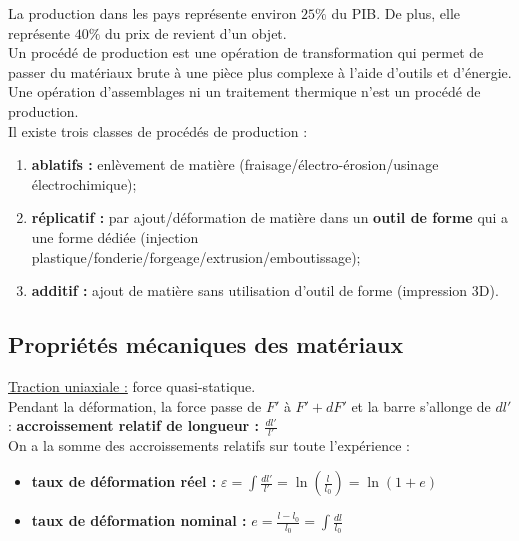 \documentclass[../main.tex]{subfiles}
\begin{document}
\localtableofcontents
La production dans les pays représente environ $25\%$ du PIB. De plus, elle représente $40\%$ du prix de revient d'un objet.\\

Un procédé de production est une opération de transformation qui permet de passer du matériaux brute à une pièce plus complexe à l'aide d'outils et d'énergie.\\
\warning Une opération d'assemblages ni un traitement thermique n'est un procédé de production.\\

Il existe trois classes de procédés de production :\\
\begin{enumerate}
    \item \textbf{ablatifs :} enlèvement de matière (fraisage/électro-érosion/usinage électrochimique);\\
    \item \textbf{réplicatif :} par ajout/déformation de matière dans un \textbf{outil de forme} qui a une forme dédiée (injection plastique/fonderie/forgeage/extrusion/emboutissage);\\
    \item \textbf{additif :} ajout de matière sans utilisation d'outil de forme (impression 3D).\\
\end{enumerate}

\subsection{Propriétés mécaniques des matériaux}
\quad \underline{Traction uniaxiale :} force quasi-statique. \\
Pendant la déformation, la force passe de $F'$ à $F'+dF'$ et la barre s'allonge de $dl'$ : \textbf{accroissement relatif de longueur : $\frac{dl'}{l'}$}\\
On a la somme des accroissements relatifs sur toute l'expérience :\\
\begin{itemize}
    \item \textbf{taux de déformation réel :} $\varepsilon = \int \frac{dl'}{l'} = \ln(\frac{l}{l_0}) = \ln(1+e)$\\
    \item \textbf{taux de déformation nominal :} $e = \frac{l-l_0}{l_0} = \int \frac{dl}{l_0}$\\
\end{itemize}
\end{document}
